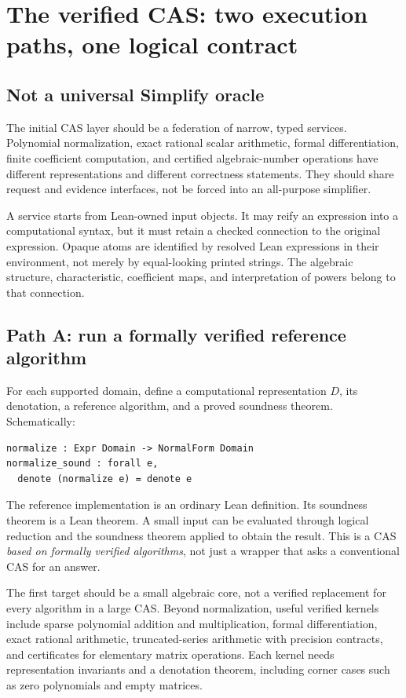 \documentclass[11pt,a4paper]{article}
\theoremstyle{remark}\newtheorem{example}[proposition]{Example}
\begin{document}
\section{The verified CAS: two execution paths, one logical contract}\label{sec:cas}
\subsection{Not a universal Simplify oracle}
The initial CAS layer should be a federation of narrow, typed services. Polynomial normalization, exact rational scalar arithmetic, formal differentiation, finite coefficient computation, and certified algebraic-number operations have different representations and different correctness statements. They should share request and evidence interfaces, not be forced into an all-purpose simplifier.

A service starts from Lean-owned input objects. It may reify an expression into a computational syntax, but it must retain a checked connection to the original expression. Opaque atoms are identified by resolved Lean expressions in their environment, not merely by equal-looking printed strings. The algebraic structure, characteristic, coefficient maps, and interpretation of powers belong to that connection.

\subsection{Path A: run a formally verified reference algorithm}
For each supported domain, define a computational representation $D$, its denotation, a reference algorithm, and a proved soundness theorem. Schematically:
\begin{lstlisting}
normalize : Expr Domain -> NormalForm Domain
normalize_sound : forall e,
  denote (normalize e) = denote e
\end{lstlisting}
The reference implementation is an ordinary Lean definition. Its soundness theorem is a Lean theorem. A small input can be evaluated through logical reduction and the soundness theorem applied to obtain the result. This is a CAS \emph{based on formally verified algorithms}, not just a wrapper that asks a conventional CAS for an answer.

The first target should be a small algebraic core, not a verified replacement for every algorithm in a large CAS. Beyond normalization, useful verified kernels include sparse polynomial addition and multiplication, formal differentiation, exact rational arithmetic, truncated-series arithmetic with precision contracts, and certificates for elementary matrix operations. Each kernel needs representation invariants and a denotation theorem, including corner cases such as zero polynomials and empty matrices.
\end{document}
